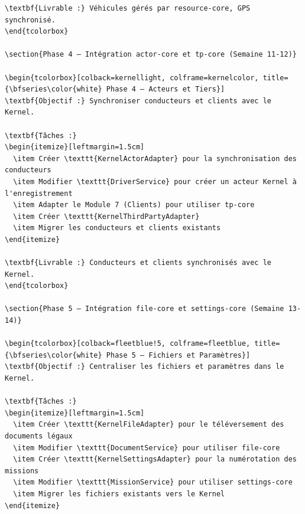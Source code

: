 \documentclass[12pt,a4paper]{report}
\begin{document}
\begin{lstlisting}[style=javaStyle, caption={Handler d'erreurs Kernel dans GlobalExceptionHandler}]
\textbf{Livrable :} Véhicules gérés par resource-core, GPS synchronisé.
\end{tcolorbox}

\section{Phase 4 — Intégration actor-core et tp-core (Semaine 11-12)}

\begin{tcolorbox}[colback=kernellight, colframe=kernelcolor, title={\bfseries\color{white} Phase 4 — Acteurs et Tiers}]
\textbf{Objectif :} Synchroniser conducteurs et clients avec le Kernel.

\textbf{Tâches :}
\begin{itemize}[leftmargin=1.5cm]
  \item Créer \texttt{KernelActorAdapter} pour la synchronisation des conducteurs
  \item Modifier \texttt{DriverService} pour créer un acteur Kernel à l'enregistrement
  \item Adapter le Module 7 (Clients) pour utiliser tp-core
  \item Créer \texttt{KernelThirdPartyAdapter}
  \item Migrer les conducteurs et clients existants
\end{itemize}

\textbf{Livrable :} Conducteurs et clients synchronisés avec le Kernel.
\end{tcolorbox}

\section{Phase 5 — Intégration file-core et settings-core (Semaine 13-14)}

\begin{tcolorbox}[colback=fleetblue!5, colframe=fleetblue, title={\bfseries\color{white} Phase 5 — Fichiers et Paramètres}]
\textbf{Objectif :} Centraliser les fichiers et paramètres dans le Kernel.

\textbf{Tâches :}
\begin{itemize}[leftmargin=1.5cm]
  \item Créer \texttt{KernelFileAdapter} pour le téléversement des documents légaux
  \item Modifier \texttt{DocumentService} pour utiliser file-core
  \item Créer \texttt{KernelSettingsAdapter} pour la numérotation des missions
  \item Modifier \texttt{MissionService} pour utiliser settings-core
  \item Migrer les fichiers existants vers le Kernel
\end{itemize}


\end{lstlisting}
\end{document}
